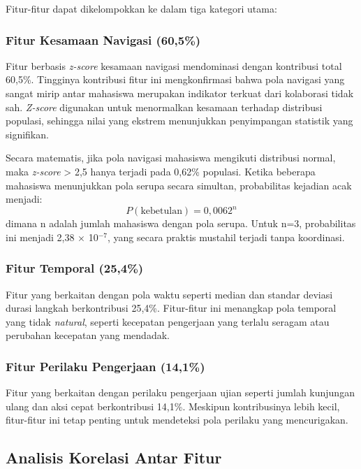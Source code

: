 Fitur-fitur dapat dikelompokkan ke dalam tiga kategori utama:

\subsubsection{Fitur Kesamaan Navigasi (60,5\%)}
Fitur berbasis \textit{z-score} kesamaan navigasi mendominasi dengan kontribusi total 60,5\%. Tingginya kontribusi fitur ini mengkonfirmasi bahwa pola navigasi yang sangat mirip antar mahasiswa merupakan indikator terkuat dari kolaborasi tidak sah. \textit{Z-score} digunakan untuk menormalkan kesamaan terhadap distribusi populasi, sehingga nilai yang ekstrem menunjukkan penyimpangan statistik yang signifikan.

Secara matematis, jika pola navigasi mahasiswa mengikuti distribusi normal, maka \textit{z-score} > 2,5 hanya terjadi pada 0,62\% populasi. Ketika beberapa mahasiswa menunjukkan pola serupa secara simultan, probabilitas kejadian acak menjadi:
\[P(\text{kebetulan}) = 0,0062^n\]
dimana n adalah jumlah mahasiswa dengan pola serupa. Untuk n=3, probabilitas ini menjadi 2,38 $\times$ 10$^{-7}$, yang secara praktis mustahil terjadi tanpa koordinasi.

\subsubsection{Fitur Temporal (25,4\%)}
Fitur yang berkaitan dengan pola waktu seperti median dan standar deviasi durasi langkah berkontribusi 25,4\%. Fitur-fitur ini menangkap pola temporal yang tidak \textit{natural}, seperti kecepatan pengerjaan yang terlalu seragam atau perubahan kecepatan yang mendadak.

\subsubsection{Fitur Perilaku Pengerjaan (14,1\%)}
Fitur yang berkaitan dengan perilaku pengerjaan ujian seperti jumlah kunjungan ulang dan aksi cepat berkontribusi 14,1\%. Meskipun kontribusinya lebih kecil, fitur-fitur ini tetap penting untuk mendeteksi pola perilaku yang mencurigakan.

\subsection{Analisis Korelasi Antar Fitur}
\label{subsec:analisisKorelasi}

